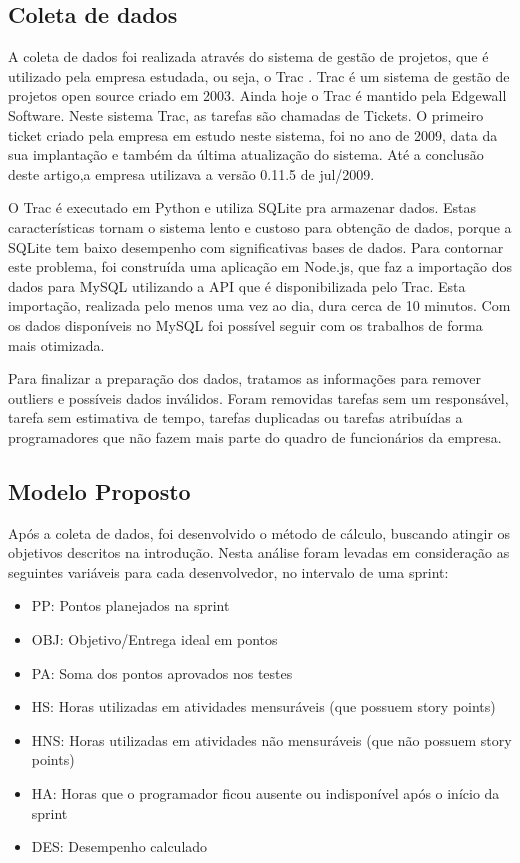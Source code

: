 \subsection{Coleta de dados}
A coleta de dados foi realizada através do sistema de gestão de projetos, que é utilizado pela empresa estudada, ou seja, o Trac \cite{TracProject}. Trac é um sistema de gestão de projetos open source criado em 2003. Ainda hoje o Trac é mantido pela Edgewall Software. Neste sistema Trac, as tarefas são chamadas de Tickets. O primeiro ticket criado pela empresa em estudo neste sistema, foi no ano de 2009, data da sua implantação e também da última atualização do sistema. Até a conclusão deste artigo,a empresa utilizava a versão 0.11.5 de jul/2009.\par
O Trac é executado em Python e utiliza SQLite pra armazenar dados. Estas características tornam o sistema lento e custoso para obtenção de dados, porque a SQLite tem baixo desempenho com significativas bases de dados. Para contornar este problema, foi construída uma aplicação em Node.js, que faz a importação dos dados para MySQL utilizando a API que é disponibilizada pelo Trac. Esta importação, realizada pelo menos uma vez ao dia, dura cerca de 10 minutos. Com os dados disponíveis no MySQL foi possível seguir com os trabalhos de forma mais otimizada. \par
Para finalizar a preparação dos dados, tratamos as informações para remover outliers e possíveis dados inválidos. Foram removidas tarefas sem um responsável, tarefa sem estimativa de tempo, tarefas duplicadas ou tarefas atribuídas a programadores que não fazem mais parte do quadro de funcionários da empresa.\par

\subsection{Modelo Proposto}
Após a coleta de dados, foi desenvolvido o método de cálculo, buscando atingir os objetivos descritos na introdução. Nesta análise foram levadas em consideração as seguintes variáveis para cada desenvolvedor, no intervalo de uma sprint:
\begin{itemize}
    \item PP: Pontos planejados na sprint
    \item OBJ: Objetivo/Entrega ideal em pontos
    \item PA: Soma dos pontos aprovados nos testes
    \item HS: Horas utilizadas em atividades mensuráveis (que possuem story points)
    \item HNS: Horas utilizadas em atividades não mensuráveis (que não possuem story points)
    \item HA: Horas que o programador ficou ausente ou indisponível após o início da sprint
    \item DES: Desempenho calculado
\end{itemize}

